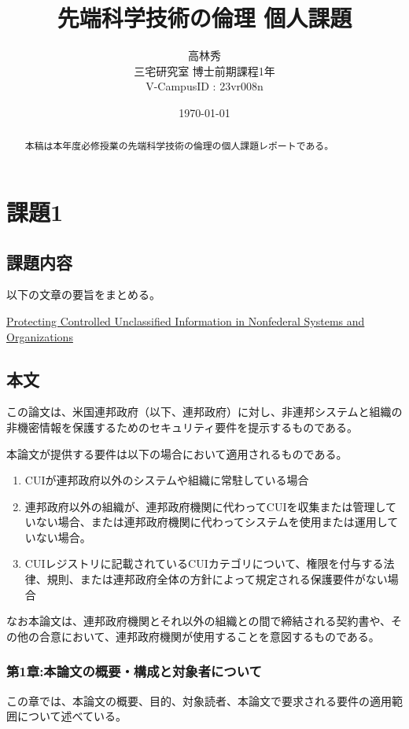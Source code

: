 \documentclass{article}[jsarticle]
\title{先端科学技術の倫理 個人課題}
\author{高林秀 \\ 三宅研究室 博士前期課程1年 \\ V-CampusID : 23vr008n}
\date{\today}
\begin{document}
\maketitle

\begin{abstract}
    本稿は本年度必修授業の先端科学技術の倫理の個人課題レポートである。\par
\end{abstract}

\tableofcontents

\section{課題1}
\subsection{課題内容}
以下の文章の要旨をまとめる。\par
\href{https://nvlpubs.nist.gov/nistpubs/SpecialPublications/NIST.SP.800-171r2.pdf}{Protecting Controlled Unclassified Information in Nonfederal Systems and Organizations}
\subsection{本文}
この論文は、米国連邦政府（以下、連邦政府）に対し、非連邦システムと組織の非機密情報を保護するためのセキュリティ要件を提示するものである。\par
本論文が提供する要件は以下の場合において適用されるものである。
\begin{enumerate}
    \item CUIが連邦政府以外のシステムや組織に常駐している場合
    \item 連邦政府以外の組織が、連邦政府機関に代わってCUIを収集または管理していない場合、または連邦政府機関に代わってシステムを使用または運用していない場合。
    \item CUIレジストリに記載されているCUIカテゴリについて、権限を付与する法律、規則、または連邦政府全体の方針によって規定される保護要件がない場合
\end{enumerate}
なお本論文は、連邦政府機関とそれ以外の組織との間で締結される契約書や、その他の合意において、連邦政府機関が使用することを意図するものである。
\subsubsection{第1章:本論文の概要・構成と対象者について}
この章では、本論文の概要、目的、対象読者、本論文で要求される要件の適用範囲について述べている。\par
\end{document}

